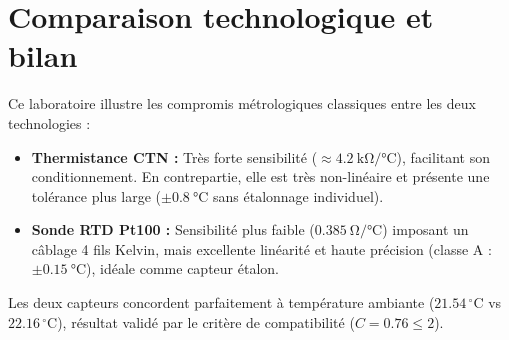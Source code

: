 \section{Comparaison technologique et bilan}
\label{sec:conclusion_synthese}

Ce laboratoire illustre les compromis métrologiques classiques entre les deux technologies :
\begin{itemize}[leftmargin=1.2cm]
    \item \textbf{Thermistance CTN :} Très forte sensibilité ($\approx \qty{4.2}{\kilo\ohm\per\degreeCelsius}$), facilitant son conditionnement. En contrepartie, elle est très non-linéaire et présente une tolérance plus large ($\pm \qty{0.8}{\degreeCelsius}$ sans étalonnage individuel).
    \item \textbf{Sonde RTD Pt100 :} Sensibilité plus faible ($\qty{0.385}{\ohm\per\degreeCelsius}$) imposant un câblage 4 fils Kelvin, mais excellente linéarité et haute précision (classe A : $\pm \qty{0.15}{\degreeCelsius}$), idéale comme capteur étalon.
\end{itemize}
Les deux capteurs concordent parfaitement à température ambiante ($21.54\,^\circ\text{C}$ vs $22.16\,^\circ\text{C}$), résultat validé par le critère de compatibilité ($C = 0.76 \le 2$).
